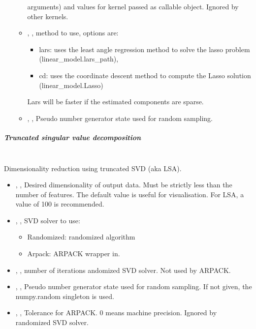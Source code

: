\begin{itemize}
\begin{itemize}
		arguments) and values for kernel passed as callable object. Ignored by other
		kernels. 
		\item {}, , method to use,
		options are:
		\begin{itemize}
			\item lars: uses the least angle regression method to solve the lasso
			 problem (linear\_model.lars\_path),
			\item cd: uses the coordinate descent method to compute the Lasso solution
			 (linear\_model.Lasso)
		\end{itemize}
		Lars will be faster if the estimated components are sparse. 
		\item {}, ,
		 Pseudo number generator state used for random sampling. 
	\end{itemize}
\end{itemize}

\subparagraph{Truncated singular value decomposition} \hfil \\
\label{subparagraph:TruncatedSVD}
Dimensionality reduction using truncated SVD (aka LSA).
\begin{itemize}
	\item {}, , Desired dimensionality
	of output data. Must be strictly less than the number of features. The default value is
	useful for visualisation. For LSA, a value of 100 is recommended. 
	\item {}, , SVD solver to use:
	\begin{itemize}
		\item Randomized: randomized algorithm
		\item Arpack: ARPACK wrapper in.
	\end{itemize}
	\item {}, , number of iterations andomized
	SVD solver. Not used by ARPACK. 
	\item {}, , Pseudo number
	generator state used for random sampling. If not given, the numpy.random singleton is used.
	\item {}, , Tolerance for ARPACK. 0 means machine
	precision. Ignored by randomized SVD solver. 
\end{itemize}

